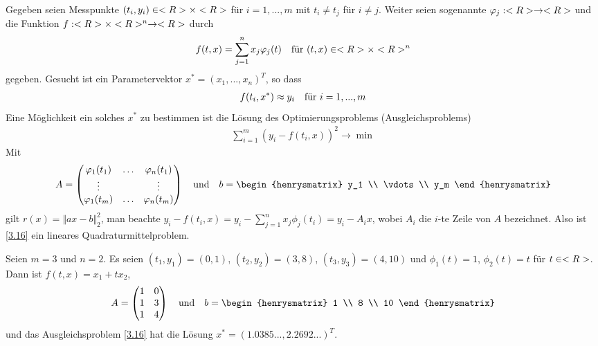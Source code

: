 Gegeben seien Messpunkte $(t_i,y_i)\in<R>\times<R>$ für $i=1,...,m$ mit $t_i\neq t_j$ für $i\neq j$. Weiter seien sogenannte  $\varphi_j:<R>\to<R>$ und die Funktion $f:<R>\times<R>^n\to<R>$ durch
\begin{align}
	f(t,x) = \sum_{j=1}^{n} x_j\varphi_j(t)\quad\text{für } (t,x)\in<R>\times<R>^n\notag
\end{align}
gegeben. Gesucht ist ein  Parametervektor $x^\ast=(x_1,...,x_n)^T$, so dass
\begin{align}
	f(t_i,x^\ast) \approx y_i\quad\text{für } i=1,...,m\notag
\end{align}
Eine Möglichkeit ein solches $x^\ast$ zu bestimmen ist die Lösung des Optimierungsproblems (Ausgleichsproblems)
\begin{align}
	\label{3.16}
	\sum_{i=1}^{m} (y_i - f(t_i,x))^2\to\min
\end{align}
Mit 
\begin{align}
	A = \begin{pmatrix}
		\phi_1(t_1) & \dots & \phi_n(t_1) \\
		\vdots && \vdots \\
		\phi_1(t_m) & \dots & \phi_n(t_m)
	\end{pmatrix} \quad\text{und}\quad b= \begin{henrysmatrix}
		y_1 \\ \vdots  \\  y_m
	\end{henrysmatrix}\notag
\end{align}
gilt $r(x)=\Vert ax-b\Vert_2^2$, man beachte $y_i-f(t_i,x)=y_i-\sum_{j=1}^n x_j\phi_j(t_i)=y_i-A_ix$, wobei $A_i$ die $i$-te Zeile von $A$ bezeichnet. Also ist \cref{3.16} ein lineares Quadraturmittelproblem.

\begin{example}[Ausgleichsgerade]
	Seien $m=3$ und $n=2$. Es seien $(t_1,y_1)=(0,1)$, $(t_2,y_2)=(3,8)$, $(t_3,y_3)=(4,10)$ und $\phi_1(t)=1$, $\phi_2(t)=t$ für $t\in<R>$. Dann ist $f(t,x)=x_1+tx_2$, 
	\begin{align}
		A = \begin{pmatrix}
			1 & 0 \\ 1 & 3 \\ 1 & 4
		\end{pmatrix}\quad\text{und}\quad b = \begin{henrysmatrix}
			1 \\ 8 \\ 10
		\end{henrysmatrix} \notag
	\end{align}
	und das Ausgleichsproblem \cref{3.16} hat die Lösung $x^\ast=(1.0385..., 2.2692...)^T$.
	\begin{center}
	\end{center}
\end{example}
